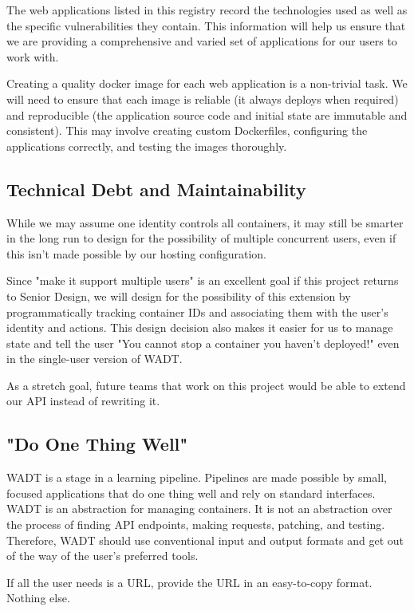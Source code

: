 \documentclass[12pt]{article}
\begin{document}
The web applications listed in this registry record the technologies used as well as the specific vulnerabilities they contain. This information will help us ensure that we are providing a comprehensive and varied set of applications for our users to work with.

Creating a quality docker image for each web application is a non-trivial task. We will need to ensure that each image is reliable (it always deploys when required) and reproducible (the application source code and initial state are immutable and consistent). This may involve creating custom Dockerfiles, configuring the applications correctly, and testing the images thoroughly.

\subsection{Technical Debt and Maintainability}
While we may assume one identity controls all containers, it may still be smarter in the long run to design for the possibility of multiple concurrent users, even if this isn't made possible by our hosting configuration.

Since "make it support multiple users" is an excellent goal if this project returns to Senior Design, we will design for the possibility of this extension by programmatically tracking container IDs and associating them with the user's identity and actions. This design decision also makes it easier for us to manage state and tell the user "You cannot stop a container you haven't deployed!" even in the single-user version of WADT.

As a stretch goal, future teams that work on this project would be able to extend our API instead of rewriting it.

\subsection{"Do One Thing Well"}
WADT is a stage in a learning pipeline. Pipelines are made possible by small, focused applications that do one thing well and rely on standard interfaces. WADT is an abstraction for managing containers. It is not an abstraction over the process of finding API endpoints, making requests, patching, and testing. Therefore, WADT should use conventional input and output formats and get out of the way of the user's preferred tools.

If all the user needs is a URL, provide the URL in an easy-to-copy format. Nothing else.
\end{document}
